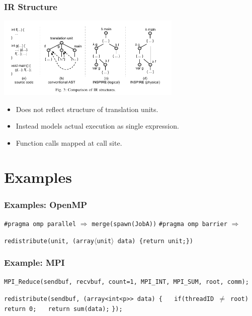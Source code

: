 \documentclass{beamer}
\begin{document}
\begin{frame}
\frametitle{IR Structure}

\begin{center}
\includegraphics[width=250pt]{structure}
\end{center}

\begin{itemize}
\item Does not reflect structure of translation units. 

\item Instead models actual execution as single expression. 

\item Function calls mapped at call site. 
\end{itemize}
\end{frame}

\section{Examples}
\begin{frame}
\frametitle{Examples: OpenMP}

\texttt{\#pragma omp parallel} $\Rightarrow$ \texttt{merge(spawn(JobA))}
\medskip
\newline\pause
\texttt{\#pragma omp barrier} $\Rightarrow$ 


\texttt{redistribute(unit, (array$\langle$unit$\rangle$ data) \{return unit;\})}
\end{frame}

\begin{frame}
\frametitle{Example: MPI}

\texttt{MPI\_Reduce(sendbuf, recvbuf, count=1, MPI\_INT, MPI\_SUM, root, comm);}
\bigskip

\texttt{redistribute(sendbuf, (array<int<p>> data) \{}
\textcolor{white}{foo}\texttt{if(threadID $\neq$ root) return 0;}
\newline
\textcolor{white}{foo}\texttt{return sum(data);}
\newline
\texttt{\});}
\end{frame}
\end{document}

